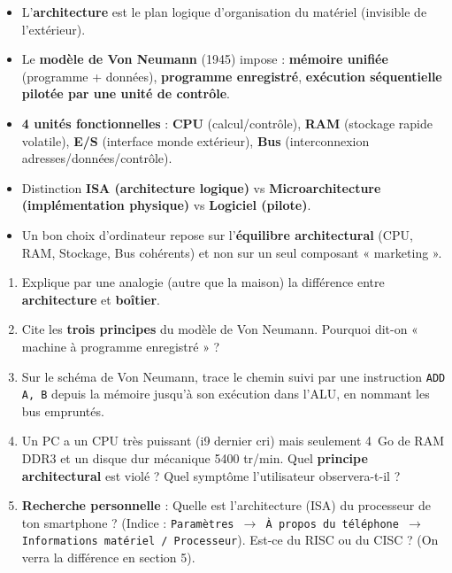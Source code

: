 \documentclass[11pt]{article}
\begin{document}
\begin{aretenir}
\begin{itemize}
    \item L'\textbf{architecture} est le plan logique d'organisation du matériel (invisible de l'extérieur).
    \item Le \textbf{modèle de Von Neumann} (1945) impose : \textbf{mémoire unifiée} (programme + données), \textbf{programme enregistré}, \textbf{exécution séquentielle pilotée par une unité de contrôle}.
    \item \textbf{4 unités fonctionnelles} : \textbf{CPU} (calcul/contrôle), \textbf{RAM} (stockage rapide volatile), \textbf{E/S} (interface monde extérieur), \textbf{Bus} (interconnexion adresses/données/contrôle).
    \item Distinction \textbf{ISA (architecture logique)} vs \textbf{Microarchitecture (implémentation physique)} vs \textbf{Logiciel (pilote)}.
    \item Un bon choix d'ordinateur repose sur l'\textbf{équilibre architectural} (CPU, RAM, Stockage, Bus cohérents) et non sur un seul composant « marketing ».
\end{itemize}
\end{aretenir}

\begin{exercice}
\begin{enumerate}
    \item Explique par une analogie (autre que la maison) la différence entre \textbf{architecture} et \textbf{boîtier}.
    \item Cite les \textbf{trois principes} du modèle de Von Neumann. Pourquoi dit-on « machine à programme enregistré » ?
    \item Sur le schéma de Von Neumann, trace le chemin suivi par une instruction \texttt{ADD A, B} depuis la mémoire jusqu'à son exécution dans l'ALU, en nommant les bus empruntés.
    \item Un PC a un CPU très puissant (i9 dernier cri) mais seulement \SI{4}{Go} de RAM DDR3 et un disque dur mécanique 5400 tr/min. Quel \textbf{principe architectural} est violé ? Quel symptôme l'utilisateur observera-t-il ?
    \item \textbf{Recherche personnelle} : Quelle est l'architecture (ISA) du processeur de ton smartphone ? (Indice : \texttt{Paramètres $\to$ À propos du téléphone $\to$ Informations matériel / Processeur}). Est-ce du RISC ou du CISC ? (On verra la différence en section 5).
\end{enumerate}
\end{exercice}
\end{document}

